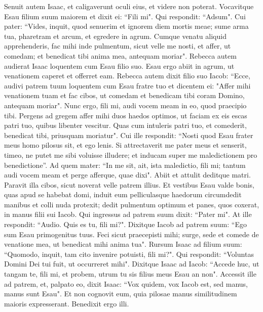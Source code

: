 \begin{biblechapter}  
\verse Senuit autem Isaac, et caligaverunt oculi eius, et videre non poterat. Vocavitque Esau filium suum maiorem et dixit ei: “Fili mi". Qui respondit: “Adsum". 
\verse Cui pater: “Vides, inquit, quod senuerim et ignorem diem mortis meae; 
\verse sume arma tua, pharetram et arcum, et egredere in agrum. Cumque venatu aliquid apprehenderis, 
\verse fac mihi inde pulmentum, sicut velle me nosti, et affer, ut comedam; et benedicat tibi anima mea, antequam moriar". 
\verse Rebecca autem audierat Isaac loquentem cum Esau filio suo. Esau ergo abiit in agrum, ut venationem caperet et offerret eam. 
\verse Rebecca autem dixit filio suo Iacob: “Ecce, audivi patrem tuum loquentem cum Esau fratre tuo et dicentem ei: 
\verse "Affer mihi venationem tuam et fac cibos, ut comedam et benedicam tibi coram Domino, antequam moriar". 
\verse Nunc ergo, fili mi, audi vocem meam in eo, quod praecipio tibi. 
\verse Pergens ad gregem affer mihi duos haedos optimos, ut faciam ex eis escas patri tuo, quibus libenter vescitur. 
\verse Quas cum intuleris patri tuo, et comederit, benedicat tibi, priusquam moriatur". 
\verse Cui ille respondit: “Nosti quod Esau frater meus homo pilosus sit, et ego lenis. 
\verse Si attrectaverit me pater meus et senserit, timeo, ne putet me sibi voluisse illudere; et inducam super me maledictionem pro benedictione”.  
\verse Ad quem mater: “In me sit, ait, ista maledictio, fili mi; tantum audi vocem meam et perge afferque, quae dixi". 
\verse Abiit et attulit deditque matri. Paravit illa cibos, sicut noverat velle patrem illius. 
\verse Et vestibus Esau valde bonis, quas apud se habebat domi, induit eum 
\verse pelliculasque haedorum circumdedit manibus et colli nuda protexit; 
\verse dedit pulmentum optimum et panes, quos coxerat, in manus filii sui Iacob. 
\verse Qui ingressus ad patrem suum dixit: “Pater mi". At ille respondit: “Audio. Quis es tu, fili mi?". 
\verse Dixitque Iacob ad patrem suum: “Ego sum Esau primogenitus tuus. Feci sicut praecepisti mihi; surge, sede et comede de venatione mea, ut benedicat mihi anima tua". 
\verse Rursum Isaac ad filium suum: “Quomodo, inquit, tam cito invenire potuisti, fili mi?". Qui respondit: “Voluntas Domini Dei tui fuit, ut occurreret mihi". 
\verse Dixitque Isaac ad Iacob: “Accede huc, ut tangam te, fili mi, et probem, utrum tu sis filius meus Esau an non". 
\verse Accessit ille ad patrem, et, palpato eo, dixit Isaac: “Vox quidem, vox Iacob est, sed manus, manus sunt Esau". 
\verse Et non cognovit eum, quia pilosae manus similitudinem maioris expresserant. Benedixit ergo illi. 

\end{biblechapter}

